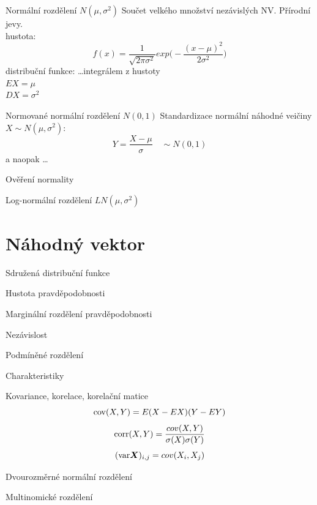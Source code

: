 \documentclass[smaller]{beamer}
\def\vc#1{\mathbf{\boldsymbol{#1}}}     %
\begin{document}
\begin{frame}{Normální rozdělení $N(\mu, \sigma^2)$}
Součet velkého množství nezávislých NV. Přírodní jevy.\\
hustota:
\[
 f(x) = \frac{1}{\sqrt{2\pi \sigma^2}} exp\Big( - \frac{ (x - \mu)^2}{2\sigma^2} \Big)
\]
distribuční funkce: \dots integrálem z hustoty\\
\vspace{2ex}
$EX = \mu$\\
$DX = \sigma^2$

\end{frame}


\begin{frame}{Normované normální rozdělení $N(0,1)$}
Standardizace normální náhodné veičiny $X \sim N(\mu, \sigma^2)$:
\[
 Y = \frac{X - \mu}{\sigma} \quad \sim N(0,1)
\]
a naopak \dots
\end{frame}

\begin{frame}{Ověření normality}

\end{frame}


\begin{frame}{Log-normální rozdělení $LN(\mu, \sigma^2)$}
\end{frame}

\section{Náhodný vektor}

\begin{frame}{Sdružená distribuční funkce}
\end{frame}

\begin{frame}{Hustota pravděpodobnosti}
\end{frame}

\begin{frame}{Marginální rozdělení pravděpodobnosti}
\end{frame}

\begin{frame}{Nezávislost}
\end{frame}

\begin{frame}{Podmíněné rozdělení}
\end{frame}

\begin{frame}{Charakteristiky}
\end{frame}

\begin{frame}{Kovariance, korelace, korelační matice}
\[
  {\rm cov}(X,Y) = E(X-EX)(Y-EY)
\]
\[
  {\rm corr}(X,Y) = \frac{cov(X,Y)}{\sigma(X)\sigma(Y)}
\]
\[
  ({\rm var} \vc X )_{i,j}=cov(X_i,X_j)  
\]



 

\end{frame}


\begin{frame}{Dvourozměrné normální rozdělení}
\end{frame}

\begin{frame}{Multinomické rozdělení}
\end{frame}
\end{document}
